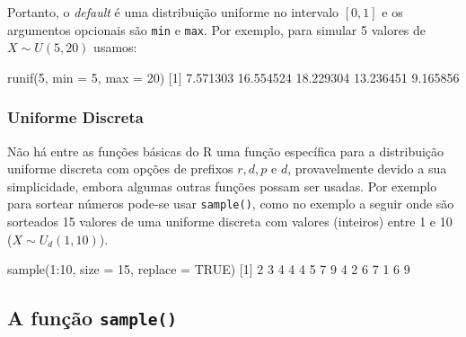 \documentclass[
  10pt,
  a4paper]{book}
\newenvironment{Shaded}{\begin{snugshade}}{\end{snugshade}}
\newcommand{\AttributeTok}[1]{\textcolor[rgb]{0.77,0.63,0.00}{#1}}
\newcommand{\ConstantTok}[1]{\textcolor[rgb]{0.00,0.00,0.00}{#1}}
\newcommand{\DecValTok}[1]{\textcolor[rgb]{0.00,0.00,0.81}{#1}}
\newcommand{\FloatTok}[1]{\textcolor[rgb]{0.00,0.00,0.81}{#1}}
\newcommand{\FunctionTok}[1]{\textcolor[rgb]{0.00,0.00,0.00}{#1}}
\newcommand{\NormalTok}[1]{#1}
\newcommand{\SpecialCharTok}[1]{\textcolor[rgb]{0.00,0.00,0.00}{#1}}
\begin{document}
Portanto, o \emph{default} é uma distribuição uniforme no intervalo \([0,1]\)
e os argumentos opcionais são \texttt{min} e \texttt{max}. Por exemplo, para simular 5
valores de \(X \sim U(5, 20)\) usamos:

\begin{Shaded}
\begin{Highlighting}[]
\FunctionTok{runif}\NormalTok{(}\DecValTok{5}\NormalTok{, }\AttributeTok{min =} \DecValTok{5}\NormalTok{, }\AttributeTok{max =} \DecValTok{20}\NormalTok{)}
\NormalTok{[}\DecValTok{1}\NormalTok{]  }\FloatTok{7.571303} \FloatTok{16.554524} \FloatTok{18.229304} \FloatTok{13.236451}  \FloatTok{9.165856}
\end{Highlighting}
\end{Shaded}

\hypertarget{uniforme-discreta}{%
\subsubsection{Uniforme Discreta}\label{uniforme-discreta}}

Não há entre as funções básicas do R uma função específica para a
distribuição uniforme discreta com opções de prefixos \(r,d,p\) e \(d\),
provavelmente devido a sua simplicidade, embora algumas outras funções
possam ser usadas. Por exemplo para sortear números pode-se usar
\texttt{sample()}, como no exemplo a seguir onde são sorteados 15 valores de
uma uniforme discreta com valores (inteiros) entre 1 e 10 (\(X \sim U_d(1,10)\)).

\begin{Shaded}
\begin{Highlighting}[]
\FunctionTok{sample}\NormalTok{(}\DecValTok{1}\SpecialCharTok{:}\DecValTok{10}\NormalTok{, }\AttributeTok{size =} \DecValTok{15}\NormalTok{, }\AttributeTok{replace =} \ConstantTok{TRUE}\NormalTok{)}
\NormalTok{ [}\DecValTok{1}\NormalTok{] }\DecValTok{2} \DecValTok{3} \DecValTok{4} \DecValTok{4} \DecValTok{4} \DecValTok{5} \DecValTok{7} \DecValTok{9} \DecValTok{4} \DecValTok{2} \DecValTok{6} \DecValTok{7} \DecValTok{1} \DecValTok{6} \DecValTok{9}
\end{Highlighting}
\end{Shaded}

\hypertarget{a-funuxe7uxe3o-sample}{%
\subsection{\texorpdfstring{A função \texttt{sample()}}{A função sample()}}\label{a-funuxe7uxe3o-sample}}
\end{document}
